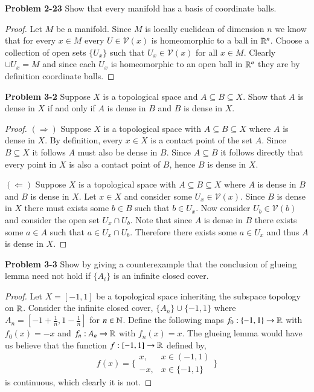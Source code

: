 \documentclass[minion]{homework651}
\begin{document}
\begin{problems}

\problem  \textbf{Problem 2-23} Show that every manifold has a basis of coordinate balls.
\begin{proof} Let $M$ be a manifold. Since $M$ is locally euclidean of dimension $n$ we know that for every $x \in M$
    every $U \in \mathcal{V}(x)$ is homeomorphic to a ball in $\mathbb R^n$. Choose a collection of open sets $\{U_x\}$ such that 
    $U_x \in \mathcal{V}(x)$ for all $x \in M$. Clearly $\cup U_x = M$  and since each $U_x$ is homeomorphic to an open ball in $\mathbb R^n$
    they are by definition coordinate balls. 
\end{proof}


\problem \textbf{Problem 3-2} Suppose $X$ is a topological space and $A \subseteq B \subseteq X$. 
Show that $A$ is dense in $X$ if and only if $A$ is dense in $B$ and $B$ is dense in $X$. 
\begin{proof} $(\Rightarrow)$ Suppose $X$ is a topological space with $A \subseteq B \subseteq X$ where $A$ is dense in $X$. 
    By definition, every $x \in X$ is a contact point of the set $A$. Since $B \subseteq X$ it follows $A$ must also be dense in $B$. 
    Since $A \subseteq B$ it follows directly that every point in $X$ is also a contact point of $B$, hence $B$ is dense in $X$.  

    $(\Leftarrow)$ Suppose $X$ is a topological space with $A \subseteq B \subseteq X$ where $A$ is dense in $B$ and $B$ is dense in $X$.
    Let $x \in X$ and consider some $U_x \in \mathcal{V}(x)$. Since $B$ is dense in $X$ there must exists some $b \in B$ such that $b \in U_x$.
    Now consider $U_b \in \mathcal{V}(b)$ and consider the open set $U_x \cap U_b$. Note that since $A$ is dense in $B$ there exists some $a \in A$ such that 
    $a \in U_x \cap U_b$. Therefore there exists some $a \in U_x$ and thus $A$ is dense in $X$.  
\end{proof}


\problem \textbf{Problem 3-3} Show by giving a counterexample that the conclusion of glueing lemma need not hold if $\{A_i\}$
is an infinite closed cover. 
\begin{proof} Let $X = [-1,1]$ be a topological space inheriting the subspace topology on $\mathbb R$. Consider the infinite closed cover, 
    $\{A_n\} \cup \{-1, 1\}$ where $A_n = [-1 + \frac{1}{n}, 1 - \frac{1}{n}]$ for $n \in \mathbb N$. Define the following maps $f_0: \{-1,1\} \to \mathbb R$ with $f_0(x) = -x$
    and $f_n : A_n \to \mathbb R$ with $f_n(x) = x$. The glueing lemma would have us believe that the function $f:[-1, 1] \to \mathbb R$ defined by, 
     \begin{equation*}
        f(x) = \biggl\{\begin{array}{cc}
        x, & x \in (-1, 1)\\
        -x, & x \in \{-1, 1\} 
      \end{array}\biggr\}
    \end{equation*}
    is continuous, which clearly it is not. 
\end{proof}



\end{problems}
\end{document}

